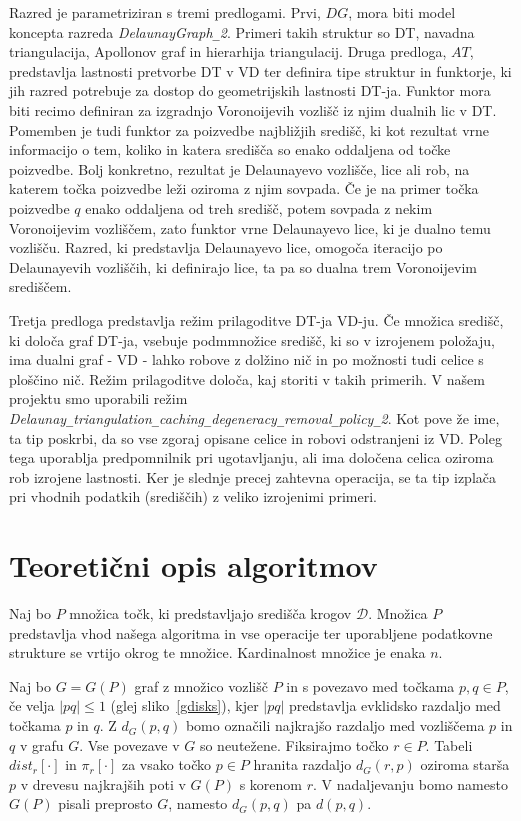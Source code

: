 \documentclass[a4paper, 12pt]{book}
\newcommand{\D}{\ensuremath{\mathcal{D}}}
\newcommand{\U}{\texttt{\_}}
\begin{document}
Razred je parametriziran s tremi predlogami. Prvi, $DG$, mora biti model koncepta razreda \textit{DelaunayGraph\U 2}. Primeri takih struktur so DT, navadna triangulacija, Apollonov graf in hierarhija triangulacij. Druga predloga, $AT$, predstavlja lastnosti pretvorbe DT v VD ter definira tipe struktur in funktorje, ki jih razred potrebuje za dostop do geometrijskih lastnosti DT-ja. Funktor mora biti recimo definiran za izgradnjo Voronoijevih vozlišč iz njim dualnih lic v DT. Pomemben je tudi funktor za poizvedbe najbližjih središč, ki kot rezultat vrne informacijo o tem, koliko in katera središča so enako oddaljena od točke poizvedbe. Bolj konkretno, rezultat je Delaunayevo vozlišče, lice ali rob, na katerem točka poizvedbe leži oziroma z njim sovpada. Če je na primer točka poizvedbe $q$ enako oddaljena od treh središč, potem sovpada z nekim Voronoijevim vozliščem, zato funktor vrne Delaunayevo lice, ki je dualno temu vozlišču. Razred, ki predstavlja Delaunayevo lice, omogoča iteracijo po Delaunayevih vozliščih, ki definirajo lice, ta pa so dualna trem Voronoijevim središčem.

Tretja predloga predstavlja režim prilagoditve DT-ja VD-ju. 
Če množica središč, ki določa graf DT-ja, vsebuje podmmnožice središč, ki so v izrojenem položaju, ima dualni graf - VD - lahko robove z dolžino nič in po možnosti tudi celice s ploščino nič. Režim prilagoditve določa, kaj storiti v takih primerih. V našem projektu smo uporabili režim \textit{Delaunay\U triangulation\U ca\-ching\U de\-ge\-ne\-ra\-cy\U re\-mo\-val\U po\-licy\U 2}. Kot pove že ime, ta tip poskrbi, da so vse zgoraj opisane celice in robovi odstranjeni iz VD. Poleg tega uporablja predpomnilnik pri ugotavljanju, ali ima določena celica oziroma rob izrojene lastnosti. Ker je slednje precej zahtevna operacija, se ta tip izplača pri vhodnih podatkih (središčih) z veliko izrojenimi primeri.



\chapter{Teoretični opis algoritmov}
Naj bo $P$ množica točk, ki predstavljajo središča krogov $\D$. Množica $P$ predstavlja vhod našega algoritma in vse operacije ter uporabljene podatkovne strukture se vrtijo okrog te množice. Kardinalnost množice je enaka $n$.

Naj bo $G=G(P)$ graf z množico vozlišč $P$ in s povezavo med točkama $p,q \in P$, če velja $|pq|\le 1$ (glej sliko~\ref{gdisks}), kjer $|pq|$ predstavlja evklidsko razdaljo med točkama $p$ in $q$. Z $d_G(p,q)$ bomo označili najkrajšo razdaljo med vozliščema $p$ in $q$ v grafu $G$. Vse povezave v $G$ so neutežene. Fiksirajmo točko $r\in P$. Tabeli $dist_r[\cdot]$ in $\pi_r[\cdot]$ za vsako točko $p\in P$ hranita razdaljo $d_G(r, p)$ oziroma starša $p$ v drevesu najkrajših poti v $G(P)$ s korenom $r$. V nadaljevanju bomo namesto $G(P)$ pisali preprosto $G$, namesto $d_G(p, q)$ pa $d(p, q)$.
\end{document}
